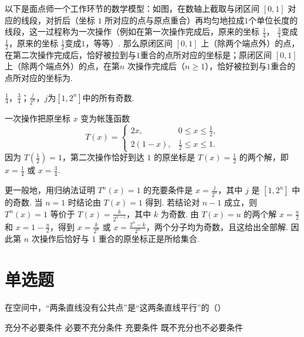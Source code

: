 \begin{problem}

以下是面点师一个工作环节的数学模型：如图，在数轴上截取与闭区间 \([0,1]\) 对应的线段，对折后（坐标 \(1\) 所对应的点与原点重合）再均匀地拉成\(1\)个单位长度的线段，这一过程称为一次操作（例如在第一次操作完成后，原来的坐标 \(\frac{1}{4}\)， \(\frac{3}{4}\)变成 \(\frac{1}{2}\)，原来的坐标 \(\frac{1}{2}\)变成\(1\)，等等）. 那么原闭区间 \([0,1]\) 上（除两个端点外）的点，在第二次操作完成后，恰好被拉到与\(1\)重合的点所对应的坐标是\fillinblank{}；原闭区间 \([0,1]\) 上（除两个端点外）的点，在第\(n\) 次操作完成后（\(n\geq 1\)），恰好被拉到与\(1\)重合的点所对应的坐标为\fillinblank{}.
\end{problem}

\begin{answer}
\(\frac14\)，\(\frac34\)；\(\frac{j}{2^n}\)，\(j\)为\([1,2^n]\)中的所有奇数.
\end{answer}

\begin{solution}
一次操作把原坐标 \(x\) 变为帐篷函数
\[
T(x)=
\begin{cases}
2x,&0\leqslant x\leqslant\frac12,\\
2(1-x),&\frac12\leqslant x\leqslant1.
\end{cases}
\]
因为 \(T(\frac12)=1\)，第二次操作恰好到达 \(1\) 的原坐标是 \(T(x)=\frac12\) 的两个解，即 \(x=\frac14\) 或 \(x=\frac34\).

更一般地，用归纳法证明 \(T^n(x)=1\) 的充要条件是 \(x=\frac{j}{2^n}\)，其中 \(j\) 是 \([1,2^n]\) 中的奇数. 当 \(n=1\) 时结论由 \(T(x)=1\) 得到. 若结论对 \(n-1\) 成立，则 \(T^{n}(x)=1\) 等价于 \(T(x)=\frac{k}{2^{n-1}}\)，其中 \(k\) 为奇数. 由 \(T(x)=u\) 的两个解 \(x=\frac{u}{2}\) 和 \(x=1-\frac{u}{2}\)，得到 \(x=\frac{k}{2^n}\) 或 \(x=\frac{2^n-k}{2^n}\)，两个分子均为奇数，且这给出全部解. 因此第 \(n\) 次操作后恰好与 \(1\) 重合的原坐标正是所给集合.
\end{solution}

\section{单选题}

\begin{problem}

在空间中，“两条直线没有公共点”是“这两条直线平行”的（\quad）

\choices
    {充分不必要条件}
    {必要不充分条件}
    {充要条件}
    {既不充分也不必要条件}
\end{problem}

